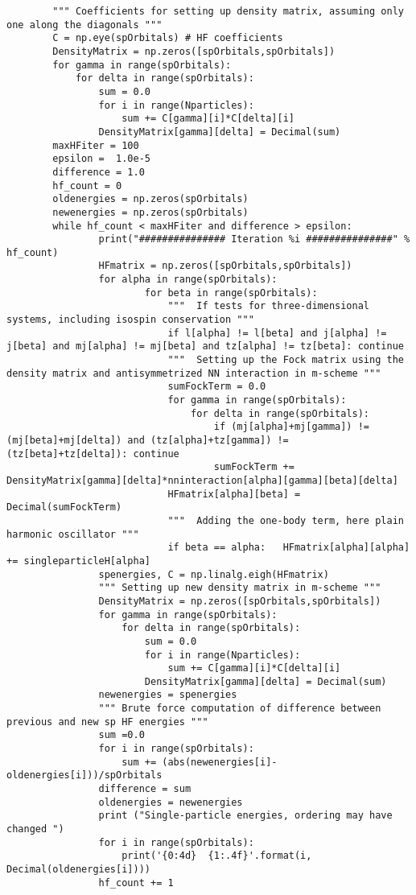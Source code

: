\documentclass[%
oneside,                 %
final,                   %
10pt]{article}
\newenvironment{doconceexercise}{}{}
\begin{document}
\begin{doconceexercise}
\begin{verbatim}
        """ Coefficients for setting up density matrix, assuming only one along the diagonals """
        C = np.eye(spOrbitals) # HF coefficients
        DensityMatrix = np.zeros([spOrbitals,spOrbitals])
        for gamma in range(spOrbitals):
            for delta in range(spOrbitals):
                sum = 0.0
                for i in range(Nparticles):
                    sum += C[gamma][i]*C[delta][i]
                DensityMatrix[gamma][delta] = Decimal(sum)
        maxHFiter = 100
        epsilon =  1.0e-5 
        difference = 1.0
        hf_count = 0
        oldenergies = np.zeros(spOrbitals)
        newenergies = np.zeros(spOrbitals)
        while hf_count < maxHFiter and difference > epsilon:
                print("############### Iteration %i ###############" % hf_count)
                HFmatrix = np.zeros([spOrbitals,spOrbitals])            
                for alpha in range(spOrbitals):
                        for beta in range(spOrbitals):
                            """  If tests for three-dimensional systems, including isospin conservation """
                            if l[alpha] != l[beta] and j[alpha] != j[beta] and mj[alpha] != mj[beta] and tz[alpha] != tz[beta]: continue
                            """  Setting up the Fock matrix using the density matrix and antisymmetrized NN interaction in m-scheme """
                            sumFockTerm = 0.0
                            for gamma in range(spOrbitals):
                                for delta in range(spOrbitals):
                                    if (mj[alpha]+mj[gamma]) != (mj[beta]+mj[delta]) and (tz[alpha]+tz[gamma]) != (tz[beta]+tz[delta]): continue
                                    sumFockTerm += DensityMatrix[gamma][delta]*nninteraction[alpha][gamma][beta][delta]
                            HFmatrix[alpha][beta] = Decimal(sumFockTerm)
                            """  Adding the one-body term, here plain harmonic oscillator """
                            if beta == alpha:   HFmatrix[alpha][alpha] += singleparticleH[alpha]
                spenergies, C = np.linalg.eigh(HFmatrix)
                """ Setting up new density matrix in m-scheme """
                DensityMatrix = np.zeros([spOrbitals,spOrbitals])
                for gamma in range(spOrbitals):
                    for delta in range(spOrbitals):
                        sum = 0.0
                        for i in range(Nparticles):
                            sum += C[gamma][i]*C[delta][i]
                        DensityMatrix[gamma][delta] = Decimal(sum)
                newenergies = spenergies
                """ Brute force computation of difference between previous and new sp HF energies """
                sum =0.0
                for i in range(spOrbitals):
                    sum += (abs(newenergies[i]-oldenergies[i]))/spOrbitals
                difference = sum
                oldenergies = newenergies
                print ("Single-particle energies, ordering may have changed ")
                for i in range(spOrbitals):
                    print('{0:4d}  {1:.4f}'.format(i, Decimal(oldenergies[i])))
                hf_count += 1



\end{verbatim}
\end{doconceexercise}
\end{document}
